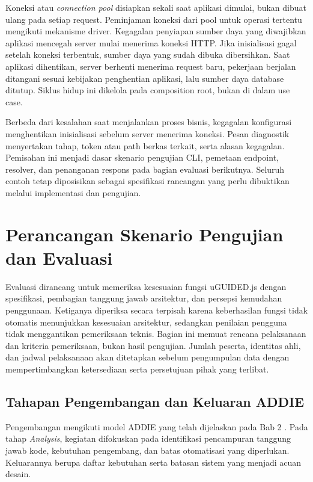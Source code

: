 \documentclass[12pt,a4paper,oneside]{report}
\begin{document}
Koneksi atau \textit{connection pool} disiapkan sekali saat aplikasi dimulai, bukan dibuat ulang pada setiap request. Peminjaman koneksi dari pool untuk operasi tertentu mengikuti mekanisme driver. Kegagalan penyiapan sumber daya yang diwajibkan aplikasi mencegah server mulai menerima koneksi HTTP. Jika inisialisasi gagal setelah koneksi terbentuk, sumber daya yang sudah dibuka dibersihkan. Saat aplikasi dihentikan, server berhenti menerima request baru, pekerjaan berjalan ditangani sesuai kebijakan penghentian aplikasi, lalu sumber daya database ditutup. Siklus hidup ini dikelola pada composition root, bukan di dalam use case.

Berbeda dari kesalahan saat menjalankan proses bisnis, kegagalan konfigurasi menghentikan inisialisasi sebelum server menerima koneksi. Pesan diagnostik menyertakan tahap, token atau path berkas terkait, serta alasan kegagalan. Pemisahan ini menjadi dasar skenario pengujian CLI, pemetaan endpoint, resolver, dan penanganan respons pada bagian evaluasi berikutnya. Seluruh contoh tetap diposisikan sebagai spesifikasi rancangan yang perlu dibuktikan melalui implementasi dan pengujian.

\clearpage
\section{Perancangan Skenario Pengujian dan Evaluasi}
\label{sec:pengujian_evaluasi}
Evaluasi dirancang untuk memeriksa kesesuaian fungsi uGUIDED.js dengan spesifikasi, pembagian tanggung jawab arsitektur, dan persepsi kemudahan penggunaan. Ketiganya diperiksa secara terpisah karena keberhasilan fungsi tidak otomatis menunjukkan kesesuaian arsitektur, sedangkan penilaian pengguna tidak menggantikan pemeriksaan teknis. Bagian ini memuat rencana pelaksanaan dan kriteria pemeriksaan, bukan hasil pengujian. Jumlah peserta, identitas ahli, dan jadwal pelaksanaan akan ditetapkan sebelum pengumpulan data dengan mempertimbangkan ketersediaan serta persetujuan pihak yang terlibat.

\subsection{Tahapan Pengembangan dan Keluaran ADDIE}
Pengembangan mengikuti model ADDIE yang telah dijelaskan pada Bab 2 \cite{branch2009addie}. Pada tahap \textit{Analysis}, kegiatan difokuskan pada identifikasi pencampuran tanggung jawab kode, kebutuhan pengembang, dan batas otomatisasi yang diperlukan. Keluarannya berupa daftar kebutuhan serta batasan sistem yang menjadi acuan desain.
\end{document}
